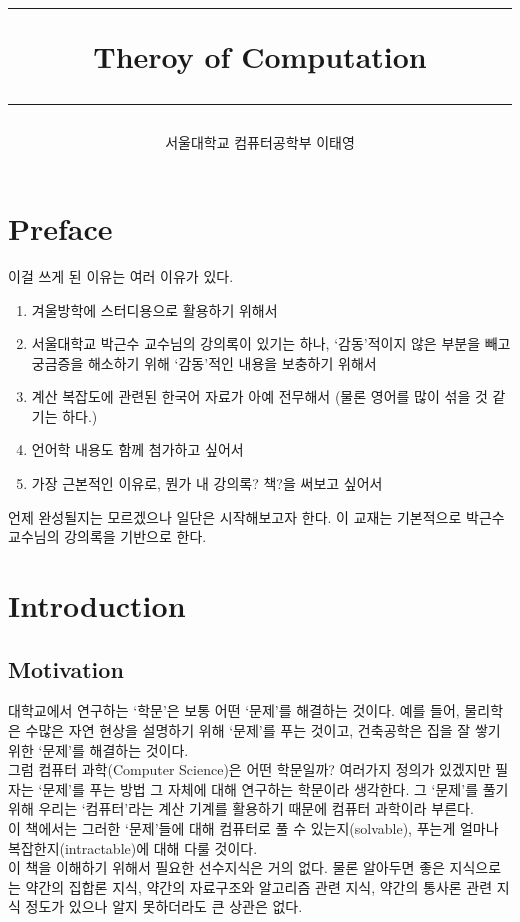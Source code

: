 \documentclass[b5paper]{book}
\title{
    \hrule
    \vspace{0.5cm}
    \bfseries\huge Theroy of Computation
    \vspace{0.5cm}
    \hrule}
\author{서울대학교 컴퓨터공학부 이태영}
\theoremstyle{definition}
\begin{document}
\maketitle
\chapter*{Preface}
이걸 쓰게 된 이유는 여러 이유가 있다. 
\begin{enumerate}
    \item 겨울방학에 스터디용으로 활용하기 위해서
    \item 서울대학교 박근수 교수님의 강의록이 있기는 하나, `감동'적이지 않은 부분을 빼고 
    궁금증을 해소하기 위해 `감동'적인 내용을 보충하기 위해서
    \item 계산 복잡도에 관련된 한국어 자료가 아예 전무해서 (물론 영어를 많이 섞을 것 같기는 하다.)
    \item 언어학 내용도 함께 첨가하고 싶어서
    \item 가장 근본적인 이유로, 뭔가 내 강의록? 책?을 써보고 싶어서
\end{enumerate}
언제 완성될지는 모르겠으나 일단은 시작해보고자 한다. 이 교재는 기본적으로 박근수
교수님의 강의록을 기반으로 한다.
\tableofcontents

\chapter{Introduction}
\section{Motivation}
대학교에서 연구하는 `학문'은 보통 어떤 `문제'를 해결하는 것이다. 
예를 들어, 물리학은 수많은 자연 현상을 설명하기 위해 `문제'를 푸는 것이고, 건축공학은
집을 잘 쌓기 위한 `문제'를 해결하는 것이다. \\
그럼 컴퓨터 과학(Computer Science)은 어떤 학문일까?
여러가지 정의가 있겠지만 필자는 `문제'를 푸는 방법 그 자체에 대해 연구하는 학문이라 생각한다. 
그 `문제'를 풀기 위해 우리는 `컴퓨터'라는 계산 기계를 활용하기 때문에 컴퓨터 과학이라 부른다.\\
이 책에서는 그러한 `문제'들에 대해 컴퓨터로 풀 수 있는지(solvable), 
푸는게 얼마나 복잡한지(intractable)에 대해 다룰 것이다. \\
이 책을 이해하기 위해서 필요한 선수지식은 거의 없다. 물론 알아두면 
좋은 지식으로는 약간의 집합론 지식, 약간의 자료구조와 알고리즘 관련 지식,
약간의 통사론 관련 지식 정도가 있으나 알지 못하더라도 큰 상관은 없다.
\end{document}
